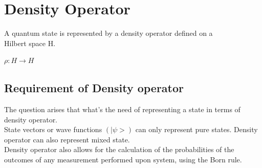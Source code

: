 \documentclass{article}
\begin{document}
\section{Density Operator}
A quantum state is represented by a density operator defined on a  \\
Hilbert space H. \\
\begin{center}
	\( \rho : H \rightarrow H\)
\end{center}
\subsection{Requirement of Density operator}
The question arises that what's the need of representing a state in terms of density operator. \\
State vectors or wave functions $(|\psi>)$ can only represent pure states. Density operator can also represent mixed state. \\
Density operator also allows for the calculation of the probabilities of the outcomes of any measurement performed upon system, using the Born rule.
\end{document}
